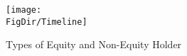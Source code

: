 \begin{figure}[ht]
  \centerline{
    \texttt{[image: \\FigDir/Timeline]}
  }
  \caption{Types of Equity and Non-Equity Holder} \label{fig:Timeline}
\end{figure}
